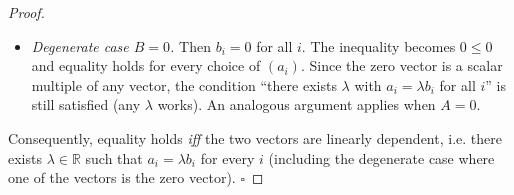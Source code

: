 \begin{proof}
\begin{itemize}
\item \emph{Degenerate case \(B=0\).}  
Then \(b_{i}=0\) for all \(i\). The inequality becomes \(0\le0\) and equality holds for every choice of \((a_{i})\). Since the zero vector is a scalar multiple of any vector, the condition “there exists \(\lambda\) with \(a_{i}=\lambda b_{i}\) for all \(i\)” is still satisfied (any \(\lambda\) works). An analogous argument applies when \(A=0\).
\end{itemize}
Consequently, equality holds \emph{iff} the two vectors are linearly dependent, i.e. there exists \(\lambda\in\mathbb{R}\) such that \(a_{i}=\lambda b_{i}\) for every \(i\) (including the degenerate case where one of the vectors is the zero vector). \(\square\)
\end{proof}